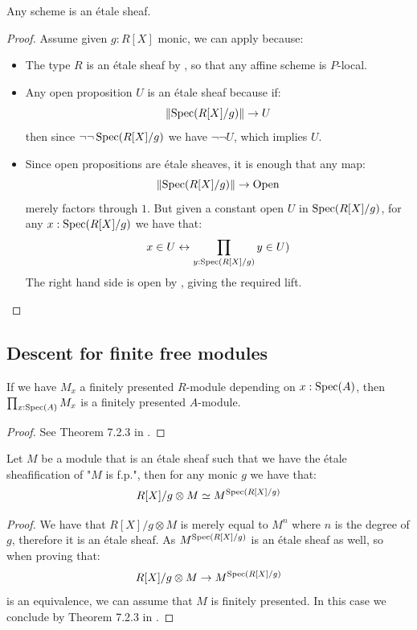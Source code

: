 \begin{proposition}\label{scheme-is-etale-sheaf}
Any scheme is an \'etale sheaf.
\end{proposition}

\begin{proof}
Assume given $g:R[X]$ monic, we can apply  because:
\begin{itemize}
\item The type $R$ is an \'etale sheaf by , so that any affine scheme is $P$-local.
\item Any open proposition $U$ is an \'etale sheaf because if:
\[\lVert \operatorname{Spec}(R[X]/g) \rVert\to U\]
then since $\neg\neg\operatorname{Spec}(R[X]/g)$ we have $\neg\neg U$, which implies $U$.
\item Since open propositions are \'etale sheaves, it is enough that any map:
\[\lVert \operatorname{Spec}(R[X]/g) \rVert\to \mathrm{Open}\]
merely factors through $1$. But given a constant open $U$ in $\operatorname{Spec}(R[X]/g)$, for any $x:\operatorname{Spec}(R[X]/g)$ we have that:
\[x\in U \leftrightarrow \prod_{y:\operatorname{Spec}(R[X]/g)} y\in U)\]
The right hand side is open by , giving the required lift. 
\end{itemize}
\end{proof}


\subsection{Descent for finite free modules}


\begin{lemma}\label{fp-equivalent-pointwise}
If we have $M_x$ a finitely presented $R$-module depending on $x:\operatorname{Spec}(A)$, then $\prod_{x:\operatorname{Spec}(A)}M_x$ is a finitely presented $A$-module.
\end{lemma}

\begin{proof}
See Theorem 7.2.3 in \cite{draft}.
\end{proof}

\begin{lemma}\label{descent-sqc-etale}
Let $M$ be a module that is an \'etale sheaf such that we have the \'etale sheafification of "$M$ is f.p.", then for any monic $g$ we have that:
\[R[X]/g\otimes M \simeq M^{\operatorname{Spec}(R[X]/g)}\]
\end{lemma}

\begin{proof}
We have that $R[X]/g\otimes M$ is merely equal to $M^n$ where $n$ is the degree of $g$, therefore it is an \'etale sheaf. As $M^{\operatorname{Spec}(R[X]/g)}$ is an \'etale sheaf as well, so when proving that:
\[R[X]/g\otimes M \to M^{\operatorname{Spec}(R[X]/g)}\]
is an equivalence, we can assume that $M$ is finitely presented. In this case we conclude by Theorem 7.2.3 in \cite{draft}.
\end{proof}

